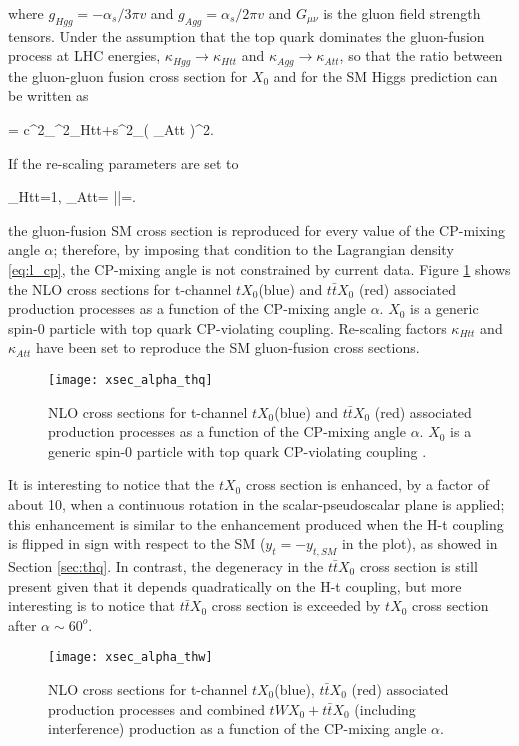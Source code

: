\noindent where $g_{Hgg}=-\alpha_s/3\pi v$ and $g_{Agg}= \alpha_s/2\pi v$ and $G_{\mu\nu}$ is the gluon field strength tensors. Under the assumption that the top quark dominates the gluon-fusion process at LHC energies, $\kappa_{Hgg} \to \kappa_{Htt}$ and  $\kappa_{Agg} \to \kappa_{Att}$, so that the ratio between the gluon-gluon fusion cross section for $X_0$ and for the SM Higgs prediction can be written as     

\beqn
{}=  c^2_\alpha\kappa^2_{Htt}+s^2_\alpha \left( \kappa_{Att} \right)^2.
\label{eq:GFrate}
\eeqn

If the re-scaling parameters are set to

\beqn
\kappa_{Htt}=1, \qquad \kappa_{Att}= \left|\right|=.
\eeqn

\noindent the gluon-fusion SM cross section is reproduced for every value of the CP-mixing angle $\alpha$; therefore, by imposing that condition to the Lagrangian density \ref{eq:l_cp}, the CP-mixing angle is not constrained by current data. Figure \ref{xsec_alpha_thq} shows the NLO cross sections for t-channel $tX_0$(blue) and $t\bar{t}X_0$ (red) associated production processes as a function of the CP-mixing angle $\alpha$. $X_0$ is a generic spin-0 particle with top quark CP-violating coupling. Re-scaling factors $\kappa_{Htt}$ and  $\kappa_{Att}$ have been set to reproduce the SM gluon-fusion cross sections.   

\begin{figure}[h!]
\centering
\texttt{[image: xsec\_alpha\_thq]}
\caption[NLO cross section for $tX_0$ and $t\bar{t}X_0$.]{NLO cross sections for t-channel $tX_0$(blue) and $t\bar{t}X_0$ (red) associated production processes as a function of the CP-mixing angle $\alpha$. $X_0$ is a generic spin-0 particle with top quark CP-violating coupling \cite{maltoni2}.} 
\label{xsec_alpha_thq}
\end{figure}

It is interesting to notice that the $tX_0$ cross section is enhanced, by a factor of about 10, when a continuous rotation in the scalar-pseudoscalar plane is applied; this enhancement is similar to the enhancement produced when the H-t coupling is flipped in sign with respect to the SM ($y_t=-y_{t,SM}$ in the plot), as showed in Section \ref{sec:thq}. In contrast, the degeneracy in the $t\bar{t}X_0$ cross section is still present given that it depends quadratically on the H-t coupling, but more interesting is to notice that $t\bar{t}X_0$ cross section is exceeded by $tX_0$ cross section after $\alpha\sim 60^o$.
\begin{figure}[h!]
\centering
\texttt{[image: xsec\_alpha\_thw]}
\caption[NLO cross section for $tWX_0$, $t\bar{t}X_0$.]{NLO cross sections for t-channel $tX_0$(blue), $t\bar{t}X_0$ (red) associated production processes and combined $tWX_0 + t\bar{t}X_0$ (including interference) production as a function of the CP-mixing angle $\alpha$\cite{maltoni2}.} 
\label{xsec_alpha_thw}
\end{figure}

